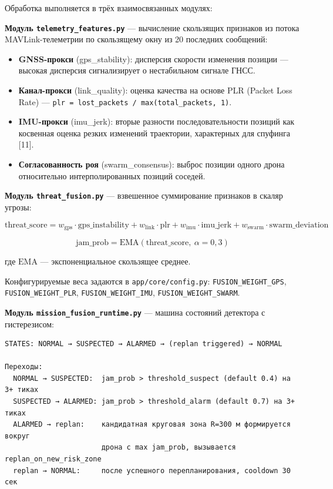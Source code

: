 Обработка выполняется в трёх взаимосвязанных модулях:

\textbf{Модуль \texttt{telemetry\_features.py}} --- вычисление скользящих признаков из потока MAVLink-телеметрии по скользящему окну из 20 последних сообщений:

\begin{itemize}
\tightlist
\item
  \textbf{GNSS-прокси} (gps\_stability): дисперсия скорости изменения позиции --- высокая дисперсия сигнализирует о нестабильном сигнале ГНСС.
\item
  \textbf{Канал-прокси} (link\_quality): оценка качества на основе PLR (Packet Loss Rate) --- \texttt{plr\ =\ lost\_packets\ /\ max(total\_packets,\ 1)}.
\item
  \textbf{IMU-прокси} (imu\_jerk): вторые разности последовательности позиций как косвенная оценка резких изменений траектории, характерных для спуфинга {[}11{]}.
\item
  \textbf{Согласованность роя} (swarm\_consensus): выброс позиции одного дрона относительно интерполированных позиций соседей.
\end{itemize}

\textbf{Модуль \texttt{threat\_fusion.py}} --- взвешенное суммирование признаков в скаляр угрозы:

\[\mathrm{threat\_score} = w_{\mathrm{gps}} \cdot \mathrm{gps\_instability} + w_{\mathrm{link}} \cdot \mathrm{plr} + w_{\mathrm{imu}} \cdot \mathrm{imu\_jerk} + w_{\mathrm{swarm}} \cdot \mathrm{swarm\_deviation}\]

\[\mathrm{jam\_prob} = \mathrm{EMA}(\mathrm{threat\_score},\ \alpha = 0{,}3)\]

где \(\mathrm{EMA}\) --- экспоненциальное скользящее среднее.

Конфигурируемые веса задаются в \texttt{app/core/config.py}: \texttt{FUSION\_WEIGHT\_GPS}, \texttt{FUSION\_WEIGHT\_PLR}, \texttt{FUSION\_WEIGHT\_IMU}, \texttt{FUSION\_WEIGHT\_SWARM}.

\textbf{Модуль \texttt{mission\_fusion\_runtime.py}} --- машина состояний детектора с гистерезисом:

\begin{verbatim}
STATES: NORMAL → SUSPECTED → ALARMED → (replan triggered) → NORMAL

Переходы:
  NORMAL → SUSPECTED:  jam_prob > threshold_suspect (default 0.4) на 3+ тиках
  SUSPECTED → ALARMED: jam_prob > threshold_alarm (default 0.7) на 3+ тиках
  ALARMED → replan:    кандидатная круговая зона R=300 м формируется вокруг
                       дрона с max jam_prob, вызывается replan_on_new_risk_zone
  replan → NORMAL:     после успешного перепланирования, cooldown 30 сек
\end{verbatim}

